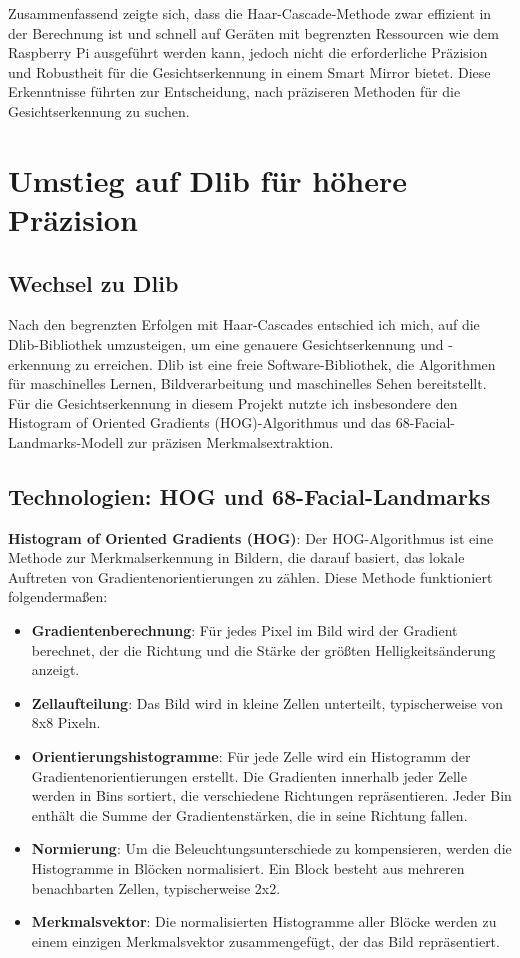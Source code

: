Zusammenfassend zeigte sich, dass die Haar-Cascade-Methode zwar effizient in der Berechnung ist und schnell auf Geräten mit begrenzten Ressourcen wie dem Raspberry Pi ausgeführt werden kann, jedoch nicht die erforderliche Präzision und Robustheit für die Gesichtserkennung in einem Smart Mirror bietet. Diese Erkenntnisse führten zur Entscheidung, nach präziseren Methoden für die Gesichtserkennung zu suchen.




\section{Umstieg auf Dlib für höhere Präzision}

\subsection{Wechsel zu Dlib}
Nach den begrenzten Erfolgen mit Haar-Cascades entschied ich mich, auf die Dlib-Bibliothek umzusteigen, um eine genauere Gesichtserkennung und -erkennung zu erreichen. Dlib ist eine freie Software-Bibliothek, die Algorithmen für maschinelles Lernen, Bildverarbeitung und maschinelles Sehen bereitstellt. Für die Gesichtserkennung in diesem Projekt nutzte ich insbesondere den Histogram of Oriented Gradients (HOG)-Algorithmus und das 68-Facial-Landmarks-Modell zur präzisen Merkmalsextraktion.

\subsection{Technologien: HOG und 68-Facial-Landmarks}
\textbf{Histogram of Oriented Gradients (HOG)}: Der HOG-Algorithmus ist eine Methode zur Merkmalserkennung in Bildern, die darauf basiert, das lokale Auftreten von Gradientenorientierungen zu zählen. Diese Methode funktioniert folgendermaßen:

\begin{itemize}
    \item \textbf{Gradientenberechnung}: Für jedes Pixel im Bild wird der Gradient berechnet, der die Richtung und die Stärke der größten Helligkeitsänderung anzeigt.
    \item \textbf{Zellaufteilung}: Das Bild wird in kleine Zellen unterteilt, typischerweise von 8x8 Pixeln.
    \item \textbf{Orientierungshistogramme}: Für jede Zelle wird ein Histogramm der Gradientenorientierungen erstellt. Die Gradienten innerhalb jeder Zelle werden in Bins sortiert, die verschiedene Richtungen repräsentieren. Jeder Bin enthält die Summe der Gradientenstärken, die in seine Richtung fallen.
    \item \textbf{Normierung}: Um die Beleuchtungsunterschiede zu kompensieren, werden die Histogramme in Blöcken normalisiert. Ein Block besteht aus mehreren benachbarten Zellen, typischerweise 2x2.
    \item \textbf{Merkmalsvektor}: Die normalisierten Histogramme aller Blöcke werden zu einem einzigen Merkmalsvektor zusammengefügt, der das Bild repräsentiert.
\end{itemize}




